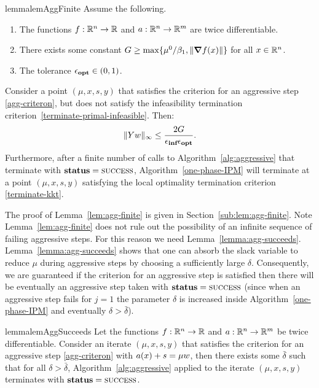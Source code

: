 \documentclass{article}
\begin{document}
\begin{restatable}{lemma}{lemAggFinite}\label{lem:agg-finite}
Assume the following.
\begin{enumerate}
\item The functions $f : \mathbb{R}^{n} \rightarrow \mathbb{R}$ and $a : \mathbb{R}^{n} \rightarrow \mathbb{R}^{m}$ are twice differentiable. 
\item There exists some constant $G \ge \max\{ \mu^{0} / \beta_{1}, \| \grad f(x) \|  \}$ for all $x \in \mathbb{R}^{n}$. 
\item The tolerance $\epsilon_{\textbf{opt}} \in (0,1)$.
\end{enumerate}
Consider a point $(\mu, x, s, y)$ that satisfies the criterion for an aggressive step \eqref{agg-criteron}, but does not satisfy the infeasibility termination criterion~\eqref{terminate-primal-infeasible}. Then:
$$
\| Y w \|_{\infty} \le \frac{2 G}{\epsilon_{\textbf{inf}} \epsilon_{\textbf{opt}}}.
$$
Furthermore, after a finite number of calls to Algorithm~\ref{alg:aggressive} that terminate with $\textbf{status} = \textsc{success}$, Algorithm~\ref{one-phase-IPM} will terminate at a point $(\mu, x, s, y)$ satisfying the local optimality termination criterion \eqref{terminate-kkt}. 
\end{restatable}

The proof of Lemma~\ref{lem:agg-finite} is given in Section~\ref{sub:lem:agg-finite}. Note Lemma~\ref{lem:agg-finite} does not rule out the possibility of an infinite sequence of failing aggressive steps. For this reason we need Lemma~\ref{lemma:agg-succeeds}. Lemma~\ref{lemma:agg-succeeds} shows that one can absorb the slack variable to reduce $\mu$ during aggressive steps by choosing a sufficiently large $\delta$. Consequently, we are guaranteed if the criterion for an aggressive step is satisfied then there will be eventually an aggressive step taken with $\textbf{status} = \textsc{success}$ (since when an aggressive step fails for $j=1$ the parameter $\delta$ is increased inside Algorithm~\ref{one-phase-IPM} and eventually $\delta > \bar{\delta}$).

\begin{restatable}{lemma}{lemAggSucceeds}\label{lemma:agg-succeeds}
Let the functions $f : \mathbb{R}^{n} \rightarrow \mathbb{R}$ and $a : \mathbb{R}^{n} \rightarrow \mathbb{R}^{m}$ be twice differentiable. Consider an iterate $(\mu, x, s, y)$ that satisfies the criterion for an aggressive step \eqref{agg-criteron} with $a(x) + s = \mu w$, then there exists some $\bar{\delta}$ such that for all $\delta > \bar{\delta}$, Algorithm~\ref{alg:aggressive} applied to the iterate $(\mu, x, s, y)$ terminates with $\textbf{status} = \textsc{success}$.
\end{restatable}
\end{document}
